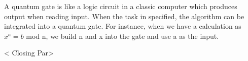 \documentclass{paper}
\begin{document}
A quantum gate is like a logic circuit in a classic computer which
produces output when reading input. When the task in specified, the
algorithm can be integrated into a quantum gate. For instance, when we
have a calculation as $x^a=b$ mod n, we build n and x into the gate and
use a as the input.


< Closing Par>
\end{document}
